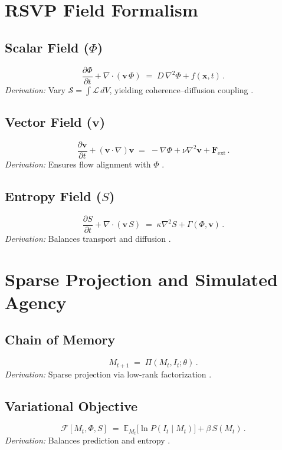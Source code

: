 \documentclass[12pt]{article}
\begin{document}
\appendix

\section{RSVP Field Formalism}
\subsection*{Scalar Field (\(\Phi\))}
\[
\frac{\partial \Phi}{\partial t} + \nabla \cdot (\mathbf{v}\,\Phi) \;=\; D\,\nabla^2 \Phi + f(\mathbf{x}, t) \, .
\]
\textit{Derivation:} Vary \(\mathcal{S}=\int \mathcal{L}\, dV\), yielding coherence–diffusion coupling \citep{atiyah1969, gromov1999}.

\subsection*{Vector Field (\(\mathbf{v}\))}
\[
\frac{\partial \mathbf{v}}{\partial t} + (\mathbf{v}\!\cdot\!\nabla)\mathbf{v} \;=\; -\nabla \Phi + \nu \nabla^2 \mathbf{v} + \mathbf{F}_{\text{ext}} \, .
\]
\textit{Derivation:} Ensures flow alignment with \(\Phi\) \citep{baez2011}.

\subsection*{Entropy Field (\(S\))}
\[
\frac{\partial S}{\partial t} + \nabla \cdot (\mathbf{v}\,S) \;=\; \kappa \nabla^2 S + \Gamma(\Phi, \mathbf{v}) \, .
\]
\textit{Derivation:} Balances transport and diffusion \citep{shannon1948, jaynes2003}.

\section{Sparse Projection and Simulated Agency}
\subsection*{Chain of Memory}
\[
M_{t+1} \;=\; \Pi(M_t, I_t; \theta) \, .
\]
\textit{Derivation:} Sparse projection via low-rank factorization \citep{pearl2009, hohwy2013}.

\subsection*{Variational Objective}
\[
\mathcal{F}[M_t, \Phi, S] \;=\; \mathbb{E}_{M_t}\!\big[\ln P(I_t \mid M_t)\big] + \beta\, S(M_t) \, .
\]
\textit{Derivation:} Balances prediction and entropy \citep{friston2010, tononi2004}.
\end{document}
